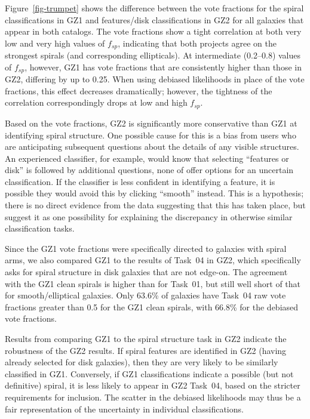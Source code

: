 \documentclass[useAMS,usenatbib]{mn2e}
\begin{document}
Figure~\ref{fig-trumpet} shows the difference between the vote fractions for the spiral classifications in GZ1 and features/disk classifications in GZ2 for all galaxies that appear in both catalogs. The vote fractions show a tight correlation at both very low and very high values of $f_{sp}$, indicating that both projects agree on the strongest spirals (and corresponding ellipticals). At intermediate (0.2--0.8) values of $f_{sp}$, however, GZ1 has vote fractions that are consistently higher than those in GZ2, differing by up to 0.25. When using debiased likelihoods in place of the vote fractions, this effect decreases dramatically; however, the tightness of the correlation correspondingly drops at low and high $f_{sp}$. 

Based on the vote fractions, GZ2 is significantly more conservative than GZ1 at identifying spiral structure. One possible cause for this is a bias from users who are anticipating subsequent questions about the details of any visible structures. An experienced classifier, for example, would know that selecting ``features or disk'' is followed by additional questions, none of offer options for an uncertain classification. If the classifier is less confident in identifying a feature, it is possible they would avoid this by clicking ``smooth'' instead. This is a hypothesis; there is no direct evidence from the data suggesting that this has taken place, but suggest it as one possibility for explaining the discrepancy in otherwise similar classification tasks. 

Since the GZ1 vote fractions were specifically directed to galaxies with spiral arms, we also compared GZ1 to the results of Task~04 in GZ2, which specifically asks for spiral structure in disk galaxies that are not edge-on. The agreement with the GZ1 clean spirals is higher than for Task~01, but still well short of that for smooth/elliptical galaxies. Only 63.6\% of galaxies have Task~04 raw vote fractions greater than 0.5 for the GZ1 clean spirals, with 66.8\% for the debiased vote fractions. 

Results from comparing GZ1 to the spiral structure task in GZ2 indicate the robustness of the GZ2 results. If spiral features are identified in GZ2 (having already selected for disk galaxies), then they are very likely to be similarly classified in GZ1. Conversely, if GZ1 classifications indicate a possible (but not definitive) spiral, it is less likely to appear in GZ2 Task~04, based on the stricter requirements for inclusion. The scatter in the debiased likelihoods may thus be a fair representation of the uncertainty in individual classifications.
\end{document}
